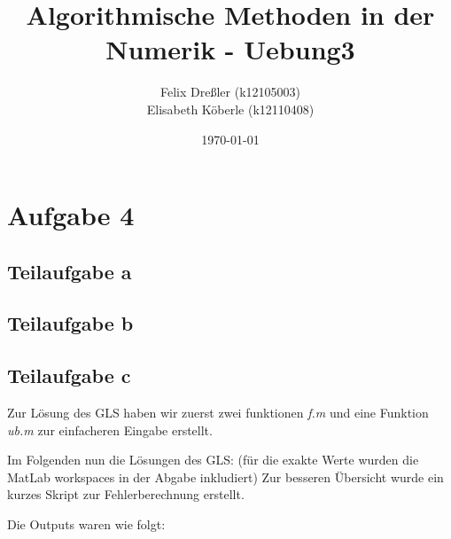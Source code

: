\documentclass[11pt,titlepage]{article}
\title{Algorithmische Methoden in der Numerik - Uebung3}
\author{Felix Dreßler (k12105003) \\ Elisabeth Köberle (k12110408)}
\date{\today} %
\begin{document}
\maketitle

	\section{Aufgabe 4}
		\subsection{Teilaufgabe a}
			
			
			
		\subsection{Teilaufgabe b}
			
		
		\subsection{Teilaufgabe c}
			Zur Lösung des GLS haben wir zuerst zwei funktionen \emph{f.m} und eine Funktion \emph{ub.m} zur einfacheren Eingabe erstellt.
			
			
			
				
			Im Folgenden nun die Lösungen des GLS: (für die exakte Werte wurden die MatLab workspaces in der Abgabe inkludiert)
			Zur besseren Übersicht wurde ein kurzes Skript zur Fehlerberechnung erstellt.
			
			
			
			Die Outputs waren wie folgt:
			
\end{document}
